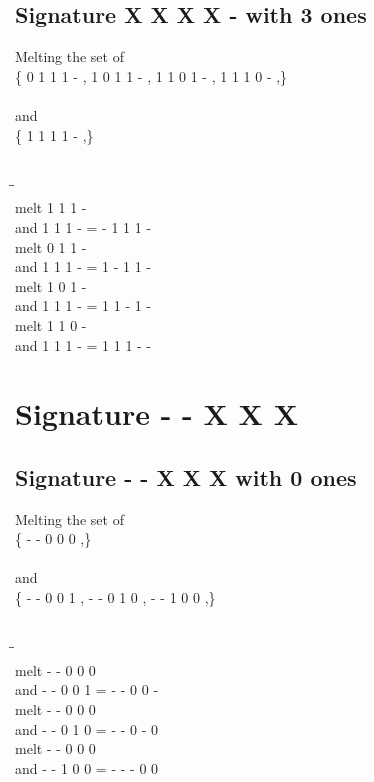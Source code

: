 \documentclass{article}
\begin{document}
\subsection{Signature X X X X - with 3 ones}
Melting the set of\\
\{ 0  1  1  1  - , 1  0  1  1  - , 1  1  0  1  - , 1  1  1  0  - ,\}\\\\
and\\
\{ 1  1  1  1  - ,\}\\\\
\begin{tabbing}
\hspace{3cm}\=\hspace{3cm}\=\hspace{3cm}\\[1cm]
melt  1  1  1  - \\
and  1  1  1  - \>
 =  -  1  1  1  - \\[1mm]
melt  0  1  1  - \\
and  1  1  1  - \>
 =  1  -  1  1  - \\[1mm]
melt  1  0  1  - \\
and  1  1  1  - \>
 =  1  1  -  1  - \\[1mm]
melt  1  1  0  - \\
and  1  1  1  - \>
 =  1  1  1  -  - \\[1mm]
\end{tabbing}
\newpage
\section{Signature - - X X X }
\subsection{Signature - - X X X with 0 ones}
Melting the set of\\
\{ -  -  0  0  0 ,\}\\\\
and\\
\{ -  -  0  0  1 , -  -  0  1  0 , -  -  1  0  0 ,\}\\\\
\begin{tabbing}
\hspace{3cm}\=\hspace{3cm}\=\hspace{3cm}\\[1cm]
melt\> -  -  0  0  0 \\
and\> -  -  0  0  1 \>
 =  -  -  0  0  - \\[1mm]
melt\> -  -  0  0  0 \\
and\> -  -  0  1  0 \>
 =  -  -  0  -  0 \\[1mm]
melt\> -  -  0  0  0 \\
and\> -  -  1  0  0 \>
 =  -  -  -  0  0 \\[1mm]
\end{tabbing}
\newpage
\end{document}
